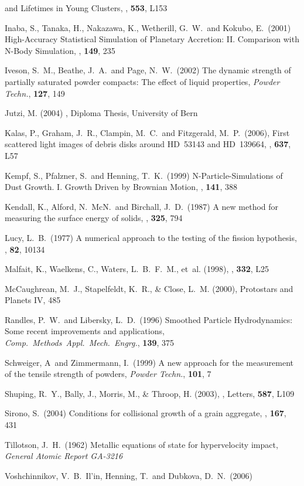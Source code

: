 \begin{literature}
and Lifetimes in Young Clusters, \apj, \textbf{553}, L153
\item Inaba, S., Tanaka, H., Nakazawa, K., Wetherill, G.~W.~and Kokubo,
E.~(2001) High-Accuracy Statistical Simulation of Planetary Accretion:
II. Comparison with N-Body Simulation, \ica, \textbf{149}, 235
\item Iveson, S.~M., Beathe, J.~A.~and Page, N.~W.~(2002) The dynamic
strength of partially saturated powder compacts: The effect of liquid
properties, \textit{Powder Techn.}, \textbf{127}, 149
\item Jutzi, M. (2004) , Diploma Thesis, University of Bern
\item Kalas, P., Graham, J.~R., Clampin, M.~C.~and Fitzgerald,
M.~P.~(2006), First scattered light images of debris disks around
HD~53143 and HD~139664, \apj, \textbf{637}, L57
\item {Kempf}, S., {Pfalzner}, S.~and {Henning}, T.~K.~(1999)
N-Particle-Simulations of Dust Growth. I. Growth Driven by Brownian
Motion, \ica, \textbf{141}, 388
\item Kendall, K., Alford, N.~McN.~and Birchall, J.~D.~(1987) A new
method for measuring the surface energy of solids, \nat, \textbf{325},
794
\item Lucy, L.~B.~(1977) A numerical approach to the testing of the
fission hypothesis, \apj, \textbf{82}, 10134
\item
{Malfait}, K., {Waelkens}, C., {Waters}, L.~B.~F.~M., {et~al.} (1998),
   \aap, {\bf 332}, L25
\item
{McCaughrean}, M.~J., {Stapelfeldt}, K.~R., \& {Close}, L.~M. (2000),
   Protostars and Planets IV, 485
\item Randles, P.~W.~and Libersky, L.~D.~(1996) Smoothed Particle
Hydrodynamics: Some recent improvements and applications,
\textit{Comp.~Methods~Appl.~Mech.~Engrg.}, \textbf{139}, 375
\item Schweiger, A~and Zimmermann, I.~(1999) A new approach for the
measurement of the tensile strength of powders, \textit{Powder Techn.},
\textbf{101}, 7
\item
{Shuping}, R.~Y., {Bally}, J., {Morris}, M., \& {Throop}, H. (2003),
   \apj, Letters, {\bf 587}, L109
\item Sirono, S.\ (2004) Conditions for collisional growth of a grain
aggregate, \ica, \textbf{167}, 431
\item Tillotson, J.~H.~(1962) Metallic equations of state for
hypervelocity impact, \textit{General Atomic Report GA-3216}
\item Voshchinnikov, V.~B.~Il'in, Henning, T.~and Dubkova, D.~N.\ (2006)

\end{literature}
